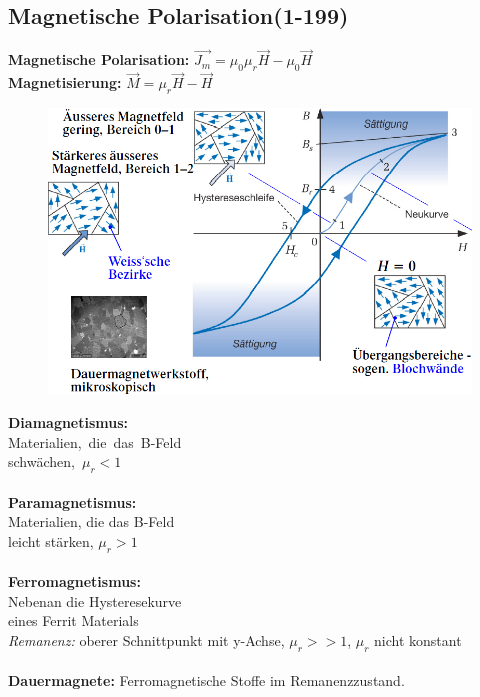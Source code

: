 \documentclass[a4paper, 6pt, landscape]{scrartcl}
\begin{document}
\begin{multicols*}{4}
	\subsection{Magnetische Polarisation(1-199)}
	\textbf{Magnetische Polarisation:} $\vec{J_m}=\mu_0\mu_r\vec{H}-\mu_0\vec{H}$\\
	\textbf{Magnetisierung:} $\vec{M}=\mu_r\vec{H}-\vec{H}$\\
	\vspace{-0.5cm}
	\begingroup
	\begin{figure}
		\begin{center}
			\includegraphics[scale=0.16]{source/hyst.png}
		\end{center}
	\end{figure}

	\mbox{\textbf{Diamagnetismus:}}\\
	\mbox{Materialien, die das B-Feld}\\
	\mbox{schwächen, $\mu_r<1$}\\ \\
	\textbf{Paramagnetismus:}\\
	Materialien, die das B-Feld\\
	leicht stärken,  $\mu_r>1$\\\\
	\mbox{\textbf{Ferromagnetismus:}} \\
	Nebenan die Hysteresekurve\\
	eines Ferrit Materials\\
	\textit{Remanenz:} oberer Schnittpunkt mit y-Achse, $\mu_r>>1$, $\mu_r$ nicht konstant\\\\
	\textbf{Dauermagnete:} Ferromagnetische Stoffe im Remanenzzustand.
	\endgroup

\end{multicols*}
\end{document}
